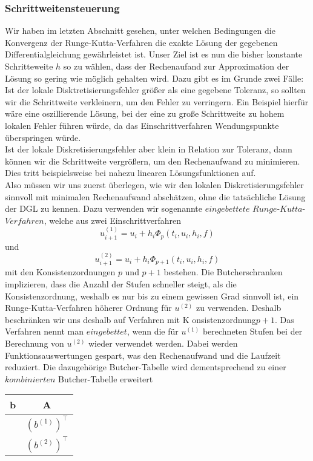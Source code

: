 \subsubsection{Schrittweitensteuerung}
Wir haben im letzten Abschnitt gesehen, unter welchen Bedingungen die Konvergenz der Runge-Kutta-Verfahren die exakte
Lösung der gegebenen Differentialgleichung gewährleistet ist. Unser Ziel ist es nun die bisher konstante Schritteweite
$h$ so zu wählen, dass der Rechenaufand zur Approximation der Lösung so gering wie möglich gehalten wird.
Dazu gibt es im Grunde zwei Fälle:\\
Ist der lokale Disktretisierungsfehler größer als eine gegebene Toleranz, so sollten wir die Schrittweite verkleinern,
um den Fehler zu verringern. Ein Beispiel hierfür wäre eine oszillierende Lösung, bei der eine zu große Schrittweite
zu hohem lokalen Fehler führen würde, da das Einschrittverfahren Wendungspunkte überspringen würde. \\
Ist der lokale Diskretisierungsfehler aber klein in Relation zur Toleranz, dann können wir die Schrittweite
vergrößern, um den Rechenaufwand zu minimieren. Dies tritt beispielsweise bei nahezu linearen Lösungsfunktionen auf. \\
Also müssen wir uns zuerst überlegen, wie wir den lokalen Diskretisierungsfehler sinnvoll mit minimalen Rechenaufwand
abschätzen, ohne die tatsächliche Lösung der DGL zu kennen. Dazu verwenden wir sogenannte
$eingebettete$ $Runge$-$Kutta$-$Verfahren$, welche aus zwei Einschrittverfahren
\[
    u_{i+1}^{(1)} = u_i + h_i \Phi_{p}(t_i,u_i,h_i,f)
\]
und
\[
    u_{i+1}^{(2)} = u_i + h_i \Phi_{p+1}(t_i,u_i,h_i,f)
\]
mit den Konsistenzordnungen $p$ und $p+1$ bestehen. Die Butcherschranken implizieren, dass die Anzahl
der Stufen schneller steigt, als die Konsistenzordnung, weshalb es nur bis zu einem gewissen Grad sinnvoll ist, ein
Runge-Kutta-Verfahren höherer Ordnung für $u^{(2)}$ zu verwenden. Deshalb beschränken wir uns deshalb auf Verfahren
mit K onsistenzordnung$p+1$.
Das Verfahren nennt man $eingebettet$, wenn die für $u^{(1)}$ berechneten Stufen bei der Berechnung von $u^{(2)}$ wieder
verwendet werden. Dabei werden Funktionsauswertungen gespart, was den Rechenaufwand und die Laufzeit reduziert. Die
dazugehörige Butcher-Tabelle wird dementsprechend zu einer $kombinierten$ Butcher-Tabelle erweitert
\begin{center}
    \begin{tabular}{c | c}
        b & A \\
        \hline
        & $(b^{(1)})^{\intercal}$ \\
        \hline
        & $(b^{(2)})^{\intercal}$
    \end{tabular}
\end{center}
